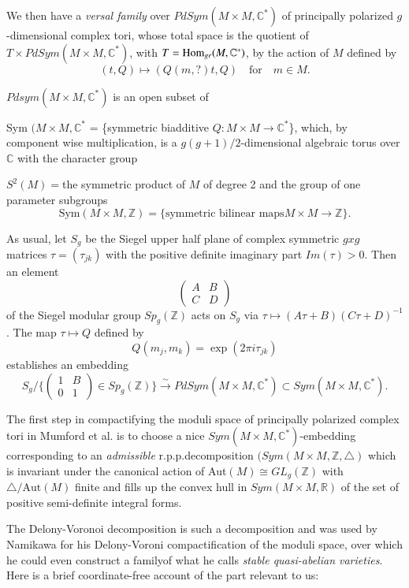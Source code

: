 We then have a \textit{versal family} over $PdSym (M \times  M,
\mathbb{C}^*)$ of principally polarized $g$-dimensional complex tori,
whose total space is the quotient of $T \times PdSym (M \times M, \mathbb{C}^*)$,
with $T= \operatorname{Hom}_{gr} (M, \mathbb{C}^*)$, by the action of $M$ defined by 
$$
(t, Q) \mapsto (Q (m, ?) t, Q) \quad \text{for} \quad  m \in M.
$$

$Pdsym (M \times M, \mathbb{C}^*)$ is an open subset of 

Sym $(M \times M, \mathbb{C}^*$ = \{symmetric biadditive $Q : M \times M \to
\mathbb{C}^*$\}, which, by component wise multiplication, is a
$g(g+1)/2$-dimensional algebraic torus over $\mathbb{C}$ with the
character group 

$S^2 (M) =$\pageoriginale the symmetric product of $M$ of degree 2 and
the group of one parameter subgroups  
$$
\text{Sym}(M \times  M, \mathbb{Z}) = \{ \text{symmetric bilinear maps} M \times
M \to \mathbb{Z}\}.  
$$

As usual, let $S_g$ be the Siegel upper half plane of complex
symmetric $g x g$ matrices $\tau = (\tau_{jk}) $ with the positive
definite imaginary part $Im(\tau) > 0$. Then an element  
$$
\begin{pmatrix}
A & B \\
 C & D 
\end{pmatrix}
$$
of the Siegel modular group $Sp_g(\mathbb{Z})$ acts on $S_g$ via $\tau
\mapsto (A\tau + B)(C\tau + D)^{-1}$. The map $\tau \mapsto Q$ defined
by  
$$
Q(m_j, m_k ) = \exp (2\pi i\tau_{jk}) 
$$
establishes an embedding
$$
S_g/\{ \begin{pmatrix} 1 & B \\ 0 & 1 \end{pmatrix} \in Sp_g
(\mathbb{Z}) \} \xrightarrow{\sim} PdSym (M \times M, \mathbb{C}^*) \subset
Sym (M \times M, \mathbb{C}^*). 
$$

The first step in compactifying the moduli space of principally
polarized complex tori in Mumford et al. \cite{keySC} is to choose a nice
$Sym (M \times M, \mathbb{C}^*)$-embedding corresponding to an \textit{
  admissible} r.p.p.decomposition $(Sym(M \times M, \mathbb{Z}, \triangle)$
which  is invariant under the canonical action of Aut$(M) \cong GL_g
(\mathbb{Z})$ with $\triangle/\text{Aut} (M)$ finite and fills up the
convex hull in $Sym (M \times M, \mathbb{R})$ of the set of positive
semi-definite integral forms. 

The Delony-Voronoi decomposition is such  a decomposition and was used
by Namikawa \cite{keyN5} for his Delony-Voroni compactification of the
moduli space, over which he could even construct a
family\pageoriginale of what he calls \textit{stable quasi-abelian
  varieties}. Here is a brief coordinate-free account of the part
relevant to us:  

